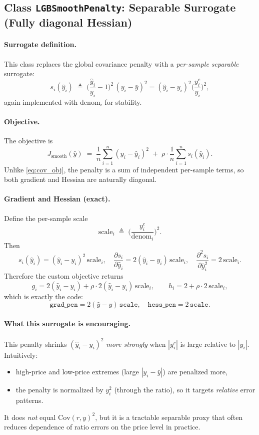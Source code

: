 \documentclass[11pt]{article}
\theoremstyle{plain}
\theoremstyle{definition}
\newcommand{\1}{\mathbf{1}}
\begin{document}
\subsection{Class \texttt{LGBSmoothPenalty}: Separable Surrogate (Fully diagonal Hessian)}
\label{subsec:lgb_smooth_penalty}

\paragraph{Surrogate definition.}
This class replaces the global covariance penalty with a \emph{per-sample separable} surrogate:
\[
s_i(\hat y_i)
\;\triangleq\;
\Big(\frac{\hat y_i}{y_i}-1\Big)^2\,(y_i-\bar y)^2
=
(\hat y_i-y_i)^2\Big(\frac{y_i^c}{y_i}\Big)^2,
\]
again implemented with $\mathrm{denom}_i$ for stability.

\paragraph{Objective.}
The objective is
\begin{equation}
\label{eq:surr_obj}
J_{\mathrm{smooth}}(\hat y)
\;=\;
\frac{1}{n}\sum_{i=1}^n (y_i-\hat y_i)^2
\;+\;
\rho\cdot \frac{1}{n}\sum_{i=1}^n s_i(\hat y_i).
\end{equation}
Unlike \eqref{eq:cov_obj}, the penalty is a sum of independent per-sample terms, so both gradient and Hessian are naturally diagonal.

\paragraph{Gradient and Hessian (exact).}
Define the per-sample scale
\[
\mathrm{scale}_i \;\triangleq\; \Big(\frac{y_i^c}{\mathrm{denom}_i}\Big)^2.
\]
Then
\[
s_i(\hat y_i)
=
(\hat y_i-y_i)^2\,\mathrm{scale}_i,
\quad
\frac{\partial s_i}{\partial \hat y_i}
=
2(\hat y_i-y_i)\,\mathrm{scale}_i,
\quad
\frac{\partial^2 s_i}{\partial \hat y_i^2}
=
2\,\mathrm{scale}_i.
\]
Therefore the custom objective returns
\begin{equation}
\label{eq:surr_grad_hess}
g_i
=
2(\hat y_i-y_i) + \rho\cdot 2(\hat y_i-y_i)\,\mathrm{scale}_i,
\qquad
h_i
=
2 + \rho\cdot 2\,\mathrm{scale}_i,
\end{equation}
which is exactly the code:
\[
\texttt{grad\_pen}=2(\hat y-y)\,\texttt{scale},\quad
\texttt{hess\_pen}=2\,\texttt{scale}.
\]

\paragraph{What this surrogate is encouraging.}
This penalty shrinks $(\hat y_i-y_i)^2$ \emph{more strongly} when $|y_i^c|$ is large relative to $|y_i|$. Intuitively:
\begin{itemize}
  \item high-price and low-price extremes (large $|y_i-\bar y|$) are penalized more,
  \item the penalty is normalized by $y_i^2$ (through the ratio), so it targets \emph{relative} error patterns.
\end{itemize}
It does \emph{not} equal $\mathrm{Cov}(r,y)^2$, but it is a tractable separable proxy that often reduces dependence of ratio errors on the price level in practice.
\end{document}
